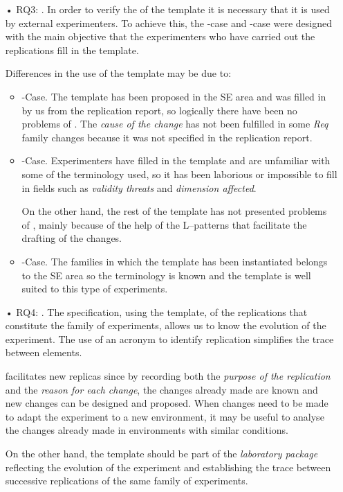 \begin{itemize}
    \item[•] RQ3: \emph{\Usability}. 
    In order to verify the \Usability of the template it is necessary that it is used by external experimenters.
    To achieve this, the \Science-case and \Automatic-case were designed with the main objective that the experimenters who have carried out the replications fill in the template. 
    
    Differences in the use of the template may be due to:

    \begin{itemize}
	    \item \SoftEng-Case. The template has been proposed in the \gls{SE} area and was filled in by us from the replication report, so logically there have been no problems of \emph{\Usability}.
	    The \emph{cause of the change} has not been fulfilled in some \emph{Req} family changes because it was not specified in the replication report.
	
	    \item \Science-Case. Experimenters have filled in the template and are unfamiliar with some of the terminology used, so it has been laborious or impossible to fill in fields such as \emph{validity threats} and \emph{dimension affected}. 
	
    	On the other hand, the rest of the template has not presented problems of \emph{\Usability}, mainly because of the help of the L--patterns that facilitate the drafting of the changes.
	
	    \item \Automatic-Case. The families in which the template has been instantiated belongs to the \gls{SE} area so the terminology is known and the template is well suited to this type of experiments.  \\

    \end{itemize}	
    
    \item[•] RQ4: \emph{\Traceability}. 
    The specification, using the template, of the replications that constitute the family of experiments, allows us to know the evolution of the experiment. The use of an acronym to identify replication simplifies the trace between elements.
    
    \emph{\Traceability} facilitates new replicas since by recording both the \emph{purpose of the replication} and the \emph{reason for each change}, the changes already made are known and new changes can be designed and proposed. When changes need to be made to adapt the experiment to a new environment, it may be useful to analyse the changes already made in environments with similar conditions.
     
    On the other hand, the template should be part of the \emph{laboratory package} reflecting the evolution of the experiment and establishing the trace between successive replications of the same family of experiments. \\

\end{itemize}

